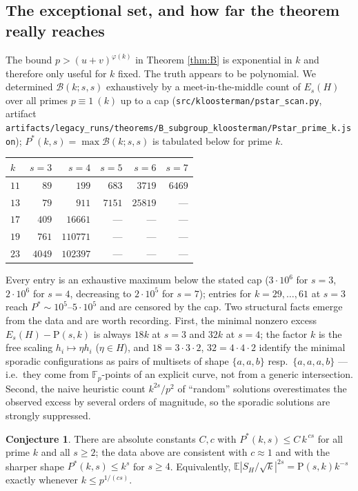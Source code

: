 \documentclass[11pt,reqno]{amsart}
\theoremstyle{definition}
\newtheorem{conjecture}[theorem]{Conjecture}
\newcommand{\FF}{\mathbb{F}}
\begin{document}
\subsection{The exceptional set, and how far the theorem really reaches}
The bound $p>(u+v)^{\varphi(k)}$ in Theorem \ref{thm:B} is exponential in $k$ and
therefore only useful for $k$ fixed. The truth appears to be polynomial. We
determined $\mathcal B(k;s,s)$ exhaustively by a meet-in-the-middle count of
$E_s(H)$ over all primes $p\equiv1\ (k)$ up to a cap
(\texttt{src/kloosterman/pstar\_scan.py}, artifact \texttt{artifacts/legacy\_runs/theorems/B\_subgroup\_kloosterman/Pstar\_prime\_k.json});
$P^\ast(k,s)=\max\mathcal B(k;s,s)$ is tabulated below for prime $k$.

\begin{center}\small
\begin{tabular}{lrrrrr}
\toprule
$k$ & $s=3$ & $s=4$ & $s=5$ & $s=6$ & $s=7$\\
\midrule
$11$ & $89$ & $199$ & $683$ & $3719$ & $6469$\\
$13$ & $79$ & $911$ & $7151$ & $25819$ & ---\\
$17$ & $409$ & $16661$ & --- & --- & ---\\
$19$ & $761$ & $110771$ & --- & --- & ---\\
$23$ & $4049$ & $102397$ & --- & --- & ---\\
\bottomrule
\end{tabular}
\end{center}

\noindent
Every entry is an exhaustive maximum below the stated cap
($3\cdot10^6$ for $s=3$, $2\cdot10^6$ for $s=4$, decreasing to $2\cdot10^5$ for
$s=7$); entries for $k=29,\dots,61$ at $s=3$ reach $P^\ast\sim10^5$--$5\cdot10^5$
and are censored by the cap. Two structural facts emerge from the data and are
worth recording. First, the minimal nonzero excess $E_s(H)-\mathrm{P}(s,k)$ is
always $18k$ at $s=3$ and $32k$ at $s=4$; the factor $k$ is the free scaling
$h_i\mapsto\eta h_i$ ($\eta\in H$), and $18=3\cdot3\cdot2$, $32=4\cdot4\cdot2$
identify the minimal sporadic configurations as pairs of multisets of shape
$\{a,a,b\}$ resp.\ $\{a,a,a,b\}$ --- i.e.\ they come from $\FF_p$-points of an
explicit curve, not from a generic intersection. Second, the naive
heuristic count $k^{2s}/p^2$ of ``random'' solutions overestimates the observed
excess by several orders of magnitude, so the sporadic solutions are strongly
suppressed.

\begin{conjecture}\label{conj:Pstar}
There are absolute constants $C,c$ with $P^\ast(k,s)\le C\,k^{\,cs}$ for all
prime $k$ and all $s\ge2$; the data above are consistent with $c\approx1$ and
with the sharper shape $P^\ast(k,s)\le k^{s}$ for $s\ge4$. Equivalently,
$\mathbb E|S_H/\sqrt k|^{2s}=\mathrm{P}(s,k)k^{-s}$ exactly whenever
$k\le p^{1/(cs)}$.
\end{conjecture}
\end{document}
